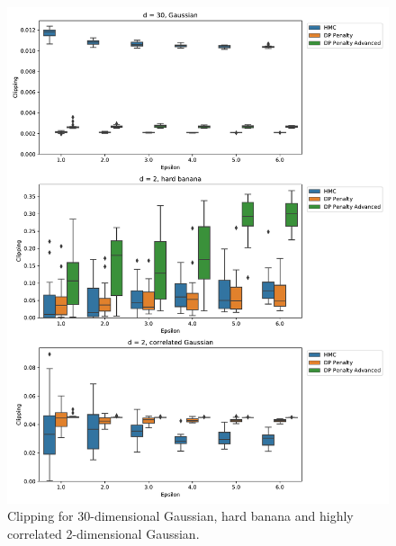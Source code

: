 \documentclass[english,twoside,openright]{HYgraduMLDS}
\begin{document}
\begin{figure}
  \centering
  \includegraphics[width=\textwidth]{figures/banana_extra_clipping}
  \caption{
    Clipping for 30-dimensional Gaussian, hard banana and highly correlated
    2-dimensional Gaussian.
  }
  \label{banana_extra_clipping_fig}
\end{figure}
\end{document}
